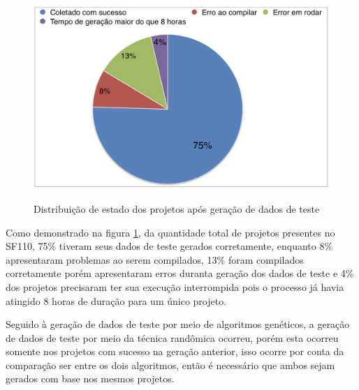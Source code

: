 \documentclass[
	12pt,				%
	oneside,			%
	a4paper,			%
	english,			%
	brazil				%
	]{abntex2ppgsi}
\begin{document}
\begin{figure}[H]%
	\centering
 	  \caption{Distribuição de estado dos projetos após geração de dados de teste}
		\includegraphics[width=\textwidth]{status_projetos.png}
	\label{fig:distribuicao-estados-projetos}
\end{figure}

Como demonstrado na figura \ref{fig:distribuicao-estados-projetos}, da quantidade total de projetos presentes no SF110, 75\% tiveram seus dados de teste gerados corretamente, enquanto 8\% apresentaram problemas ao serem compilados, 13\% foram compilados corretamente porém apresentaram erros duranta geração dos dados de teste e 4\% dos projetos precisaram ter sua execução interrompida pois o processo já havia atingido 8 horas de duração para um único projeto.

Seguido à geração de dados de teste por meio de algoritmos genéticos, a geração de dados de teste por meio da técnica randômica ocorreu, porém esta ocorreu somente nos projetos com sucesso na geração anterior, isso ocorre por conta da comparação ser entre os dois algoritmos, então é necessário que ambos sejam gerados com base nos mesmos projetos.
\end{document}
